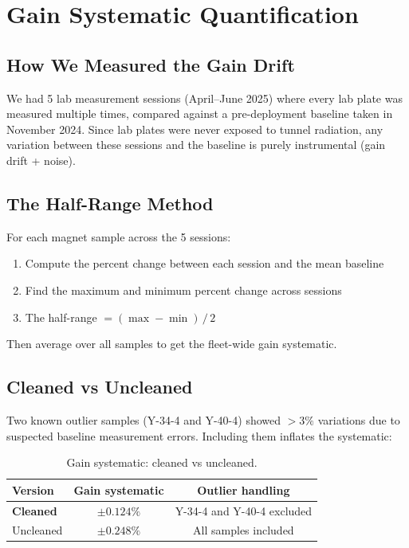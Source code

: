 \documentclass[11pt,letterpaper]{article}
\begin{document}
\section{Gain Systematic Quantification}
\label{sec:gain}

\subsection{How We Measured the Gain Drift}

We had 5 lab measurement sessions (April--June 2025) where every lab plate was
measured multiple times, compared against a pre-deployment baseline taken in
November 2024. Since lab plates were never exposed to tunnel radiation, any
variation between these sessions and the baseline is purely instrumental (gain
drift + noise).

\subsection{The Half-Range Method}

For each magnet sample across the 5 sessions:
\begin{enumerate}[nosep]
  \item Compute the percent change between each session and the mean baseline
  \item Find the maximum and minimum percent change across sessions
  \item The half-range $= (\max - \min)\,/\,2$
\end{enumerate}

Then average over all samples to get the fleet-wide gain systematic.

\subsection{Cleaned vs Uncleaned}

Two known outlier samples (Y-34-4 and Y-40-4) showed $>3\%$ variations due to
suspected baseline measurement errors. Including them inflates the systematic:

\begin{table}[htbp]
\centering
\caption{Gain systematic: cleaned vs uncleaned.}
\label{tab:gain-clean}
\begin{tabular}{@{}lcc@{}}
\toprule
Version & Gain systematic & Outlier handling \\
\midrule
\textbf{Cleaned} & $\pm 0.124\%$ & Y-34-4 and Y-40-4 excluded \\
Uncleaned        & $\pm 0.248\%$ & All samples included \\
\bottomrule
\end{tabular}
\end{table}
\end{document}
